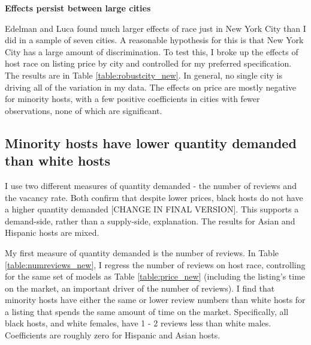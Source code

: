 \textbf{Effects persist between large cities}

Edelman and Luca found much larger effects of race just in New York City than I did in a sample of seven cities. A reasonable hypothesis for this is that New York City has a large amount of discrimination. To test this, I broke up the effects of host race on listing price by city and controlled for my preferred specification. The results are in Table \ref{table:robustcity_new}. In general, no single city is driving all of the variation in my data. The effects on price are mostly negative for minority hosts, with a few positive coefficients in cities with fewer observations, none of which are significant. 



\subsection*{Minority hosts have lower quantity demanded than white hosts}
 
I use two different measures of quantity demanded - the number of reviews and the vacancy rate. Both confirm that despite lower prices, black hosts do not have a higher quantity demanded [CHANGE IN FINAL VERSION]. This supports a demand-side, rather than a supply-side, explanation. The results for Asian and Hispanic hosts are mixed. 

My first measure of quantity demanded is the number of reviews. In Table \ref{table:numreviews_new}, I regress the number of reviews on host race, controlling for the same set of models as Table \ref{table:price_new} (including the listing's time on the market, an important driver of the number of reviews). I find that minority hosts have either the same or lower review numbers than white hosts for a listing that spends the same amount of time on the market. Specifically, all black hosts, and white females, have 1 - 2 reviews less than white males. Coefficients are roughly zero for Hispanic and Asian hosts. 

